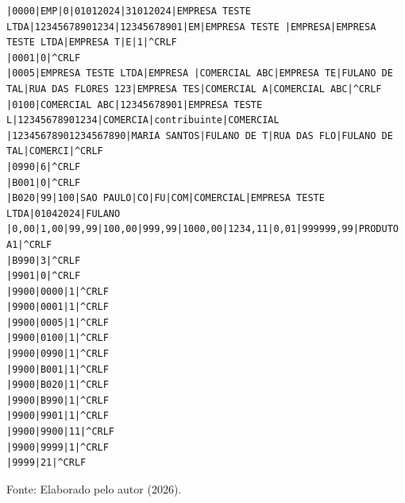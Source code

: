\begin{quadro}[H]
    \centering
    \caption{Exemplo de documento EFD}
    \label{qua:efd_exemplo}
    \begin{lstlisting}[basicstyle=\ttfamily\footnotesize, frame=single]
|0000|EMP|0|01012024|31012024|EMPRESA TESTE LTDA|12345678901234|12345678901|EM|EMPRESA TESTE |EMPRESA|EMPRESA TESTE LTDA|EMPRESA T|E|1|^CRLF
|0001|0|^CRLF
|0005|EMPRESA TESTE LTDA|EMPRESA |COMERCIAL ABC|EMPRESA TE|FULANO DE TAL|RUA DAS FLORES 123|EMPRESA TES|COMERCIAL A|COMERCIAL ABC|^CRLF
|0100|COMERCIAL ABC|12345678901|EMPRESA TESTE L|12345678901234|COMERCIA|contribuinte|COMERCIAL |12345678901234567890|MARIA SANTOS|FULANO DE T|RUA DAS FLO|FULANO DE TAL|COMERCI|^CRLF
|0990|6|^CRLF
|B001|0|^CRLF
|B020|99|100|SAO PAULO|CO|FU|COM|COMERCIAL|EMPRESA TESTE LTDA|01042024|FULANO |0,00|1,00|99,99|100,00|999,99|1000,00|1234,11|0,01|999999,99|PRODUTO A1|^CRLF
|B990|3|^CRLF
|9901|0|^CRLF
|9900|0000|1|^CRLF
|9900|0001|1|^CRLF
|9900|0005|1|^CRLF
|9900|0100|1|^CRLF
|9900|0990|1|^CRLF
|9900|B001|1|^CRLF
|9900|B020|1|^CRLF
|9900|B990|1|^CRLF
|9900|9901|1|^CRLF
|9900|9900|11|^CRLF
|9900|9999|1|^CRLF
|9999|21|^CRLF
\end{lstlisting}

    \vspace{0.2cm}
    \small{Fonte: Elaborado pelo autor (2026).}
\end{quadro}
